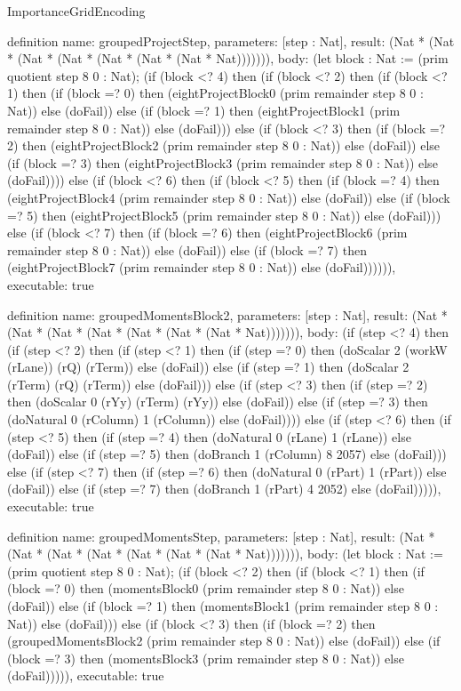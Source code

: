 \begin{lexlean}{ImportanceGridEncoding}
\begin{semanticmodule}
definition{
  name: groupedProjectStep,
  parameters: [step : Nat],
  result: (Nat * (Nat * (Nat * (Nat * (Nat * (Nat * (Nat * Nat))))))),
  body: (let block : Nat := (prim quotient step 8 0 : Nat); (if (block <? 4) then
      (if (block <? 2) then
      (if (block <? 1) then
      (if (block =? 0) then (eightProjectBlock0 (prim remainder step 8 0 : Nat)) else (doFail)) else
      (if (block =? 1) then (eightProjectBlock1 (prim remainder step 8 0 : Nat)) else (doFail))) else
      (if (block <? 3) then
      (if (block =? 2) then (eightProjectBlock2 (prim remainder step 8 0 : Nat)) else (doFail)) else
      (if (block =? 3) then (eightProjectBlock3 (prim remainder step 8 0 : Nat)) else (doFail)))) else
      (if (block <? 6) then
      (if (block <? 5) then
      (if (block =? 4) then (eightProjectBlock4 (prim remainder step 8 0 : Nat)) else (doFail)) else
      (if (block =? 5) then (eightProjectBlock5 (prim remainder step 8 0 : Nat)) else (doFail))) else
      (if (block <? 7) then
      (if (block =? 6) then (eightProjectBlock6 (prim remainder step 8 0 : Nat)) else (doFail)) else
      (if (block =? 7) then (eightProjectBlock7 (prim remainder step 8 0 : Nat)) else (doFail)))))),
  executable: true
}

definition{
  name: groupedMomentsBlock2,
  parameters: [step : Nat],
  result: (Nat * (Nat * (Nat * (Nat * (Nat * (Nat * (Nat * Nat))))))),
  body: (if (step <? 4) then
      (if (step <? 2) then
      (if (step <? 1) then
      (if (step =? 0) then (doScalar 2 (workW (rLane)) (rQ) (rTerm)) else (doFail)) else
      (if (step =? 1) then (doScalar 2 (rTerm) (rQ) (rTerm)) else (doFail))) else
      (if (step <? 3) then
      (if (step =? 2) then (doScalar 0 (rYy) (rTerm) (rYy)) else (doFail)) else
      (if (step =? 3) then (doNatural 0 (rColumn) 1 (rColumn)) else (doFail)))) else
      (if (step <? 6) then
      (if (step <? 5) then
      (if (step =? 4) then (doNatural 0 (rLane) 1 (rLane)) else (doFail)) else
      (if (step =? 5) then (doBranch 1 (rColumn) 8 2057) else (doFail))) else
      (if (step <? 7) then
      (if (step =? 6) then (doNatural 0 (rPart) 1 (rPart)) else (doFail)) else
      (if (step =? 7) then (doBranch 1 (rPart) 4 2052) else (doFail))))),
  executable: true
}

definition{
  name: groupedMomentsStep,
  parameters: [step : Nat],
  result: (Nat * (Nat * (Nat * (Nat * (Nat * (Nat * (Nat * Nat))))))),
  body: (let block : Nat := (prim quotient step 8 0 : Nat); (if (block <? 2) then
      (if (block <? 1) then
      (if (block =? 0) then (momentsBlock0 (prim remainder step 8 0 : Nat)) else (doFail)) else
      (if (block =? 1) then (momentsBlock1 (prim remainder step 8 0 : Nat)) else (doFail))) else
      (if (block <? 3) then
      (if (block =? 2) then (groupedMomentsBlock2 (prim remainder step 8 0 : Nat)) else (doFail)) else
      (if (block =? 3) then (momentsBlock3 (prim remainder step 8 0 : Nat)) else (doFail))))),
  executable: true
}


\end{semanticmodule}
\end{lexlean}
